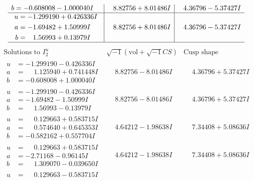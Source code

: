 \documentclass[1p]{elsarticle_modified}
\theoremstyle{definition}
\newcommand{\I}{\sqrt{-1}}
\begin{document}
$$\begin{array}{c|c|c}
\begin{aligned}
b &= -0.608008 - 1.000040 I\end{aligned}
 & \phantom{-}8.82756 + 8.01486 I & \phantom{-}4.36796 - 5.37427 I \\ \hline\begin{aligned}
u &= -1.299190 + 0.426336 I \\
a &= -1.69482 + 1.50999 I \\
b &= \phantom{-}1.56993 + 0.13979 I\end{aligned}
 & \phantom{-}8.82756 + 8.01486 I & \phantom{-}4.36796 - 5.37427 I\\
 \hline 
 \end{array}$$\newpage$$\begin{array}{c|c|c}  
\text{Solutions to }I^u_{2}& \I (\text{vol} + \sqrt{-1}CS) & \text{Cusp shape}\\
 \hline 
\begin{aligned}
u &= -1.299190 - 0.426336 I \\
a &= \phantom{-}1.125940 + 0.741448 I \\
b &= -0.608008 + 1.000040 I\end{aligned}
 & \phantom{-}8.82756 - 8.01486 I & \phantom{-}4.36796 + 5.37427 I \\ \hline\begin{aligned}
u &= -1.299190 - 0.426336 I \\
a &= -1.69482 - 1.50999 I \\
b &= \phantom{-}1.56993 - 0.13979 I\end{aligned}
 & \phantom{-}8.82756 - 8.01486 I & \phantom{-}4.36796 + 5.37427 I \\ \hline\begin{aligned}
u &= \phantom{-}0.129663 + 0.583715 I \\
a &= \phantom{-}0.574640 + 0.645353 I \\
b &= -0.582162 + 0.557704 I\end{aligned}
 & \phantom{-}4.64212 - 1.98638 I & \phantom{-}7.34408 + 5.08636 I \\ \hline\begin{aligned}
u &= \phantom{-}0.129663 + 0.583715 I \\
a &= -2.71168 - 0.96145 I \\
b &= \phantom{-}1.309070 - 0.039650 I\end{aligned}
 & \phantom{-}4.64212 - 1.98638 I & \phantom{-}7.34408 + 5.08636 I \\ \hline\begin{aligned}
u &= \phantom{-}0.129663 - 0.583715 I \\

\end{aligned}
\end{array}$$
\end{document}
